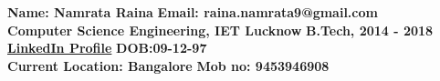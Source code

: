 \documentclass{resume}
\begin{document}

{\bf Name: Namrata Raina} \hfill {\bf Email: raina.namrata9@gmail.com}\\
{\bf Computer Science Engineering, IET Lucknow} \hfill {\bf B.Tech,
	2014 - 2018}\\
{\bf \href{https://www.linkedin.com/in/namrataraina17/}{LinkedIn Profile}} \hfill {\bf DOB:09-12-97}\\
{\bf Current Location: Bangalore} \hfill {\bf Mob no: 9453946908}\\

\vspace{-.4cm}
\end{document}
